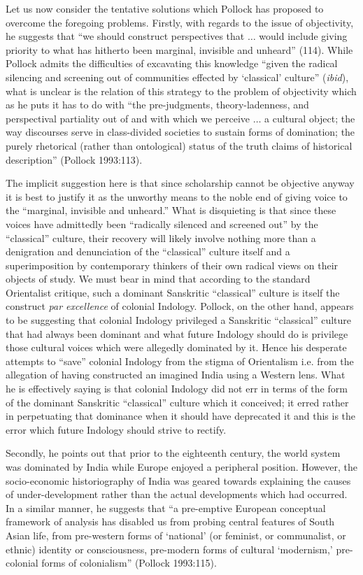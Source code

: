 Let us now consider the tentative solutions which Pollock has proposed to overcome the foregoing problems. Firstly, with regards to the issue of objectivity, he suggests that “we should construct perspectives that $\ldots$ would include giving priority to what has hitherto been marginal, invisible and unheard” (114). While Pollock admits the difficulties of excavating this knowledge “given the radical silencing and screening out of communities effected by ‘classical’ culture” ({\sl ibid}), what is unclear is the relation of this strategy to the problem of objectivity which as he puts it has to do with “the pre-judgments, theory-ladenness, and perspectival partiality out of and with which we perceive $\ldots$ a cultural object; the way discourses serve in class-divided societies to sustain forms of domination; the purely rhetorical (rather than ontological) status of the truth claims of historical description” (Pollock 1993:113). 


The implicit suggestion here is that since scholarship cannot be objective anyway it is best to justify it as the unworthy means to the noble end of giving voice to the “marginal, invisible and unheard.” What is disquieting is that since these voices have admittedly been “radically silenced and screened out” by the “classical” culture, their recovery will likely involve nothing more than a denigration and denunciation of the “classical” culture itself and a superimposition by contemporary thinkers of their own radical views on their objects of study. We must bear in mind that according to the standard Orientalist critique, such a dominant Sanskritic “classical” culture is itself the construct {\sl par excellence} of colonial Indology. Pollock, on the other hand, appears to be suggesting that colonial Indology privileged a Sanskritic “classical” culture that had always been dominant and what future Indology should do is privilege those cultural voices which were allegedly dominated by it. Hence his desperate attempts to “save” colonial Indology from the stigma of Orientalism i.e. from the allegation of having constructed an imagined India using a Western lens. What he is effectively saying is that colonial Indology did not err in terms of the form of the dominant Sanskritic “classical” culture which it conceived; it erred rather in perpetuating that dominance when it should have deprecated it and this is the error which future Indology should strive to rectify.  


Secondly, he points out that prior to the eighteenth century, the world system was dominated by India while Europe enjoyed a peripheral position. However, the socio-economic historiography of India was geared towards explaining the causes of under-development rather than the actual developments which had occurred. In a similar manner, he suggests that “a pre-emptive European conceptual framework of analysis has disabled us from probing central features of South Asian life, from pre-western forms of ‘national’ (or feminist, or communalist, or ethnic) identity or consciousness, pre-modern forms of cultural ‘modernism,’ pre-colonial forms of colonialism” (Pollock 1993:115). 

